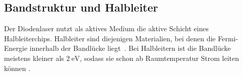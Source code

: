     \subsection{Bandstruktur und Halbleiter}
        Der Diodenlaser nutzt als aktives Medium die aktive Schicht eines Halbleiterchips.
        Halbleiter sind diejenigen Materialien, bei denen die Fermi-Energie innerhalb der Bandlücke liegt~\cite[347 f.]{gross_marx_2022}. 
        Bei Halbleitern ist die Bandlücke meistens kleiner als $\qty{2}{\electronvolt}$, sodass sie schon ab Raumtemperatur Strom leiten können \cite[714]{ashcroft_2005}.
